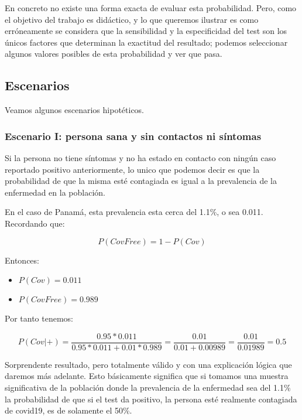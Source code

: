 \documentclass[10pt,a4paper]{article}
\begin{document}
En concreto no existe una forma exacta de evaluar esta probabilidad. Pero, como el objetivo del trabajo es didáctico, y lo que queremos ilustrar es como erróneamente se considera que la sensibilidad y la especificidad del test son los únicos factores que determinan la exactitud del resultado; podemos seleccionar algunos valores posibles de esta probabilidad y ver que pasa.

\subsection{Escenarios}

Veamos algunos escenarios hipotéticos.

\subsubsection{Escenario I: persona sana y sin contactos ni síntomas}

Si la persona no tiene síntomas y no ha estado en contacto con ningún caso reportado positivo anteriormente, lo unico que podemos decir es que la probabilidad de que la misma esté contagiada es igual a la prevalencia de la enfermedad en la población. 

En el caso de Panamá, esta prevalencia esta cerca del 1.1\%, o sea 0.011. Recordando que:

\begin{equation*}
P(CovFree) = 1 - P(Cov)
\end{equation*}

Entonces:

\begin{itemize}
\item $P(Cov) = 0.011$
\item $P(CovFree) = 0.989$
\end{itemize}


Por tanto tenemos:

\begin{equation*}
P(Cov|+) = \frac{0.95*0.011}{0.95*0.011 + 0.01*0.989} = \frac{0.01}{0.01 + 0.00989} = \frac{0.01}{0.01989} = 0.5
\end{equation*}

Sorprendente resultado, pero totalmente válido y con una explicación lógica que daremos más adelante. Esto básicamente significa que si tomamos una muestra significativa de la población donde la prevalencia de la enfermedad sea del 1.1\% la probabilidad de que si el test da positivo, la persona esté realmente contagiada de covid19, es de solamente el 50\%.
\end{document}
